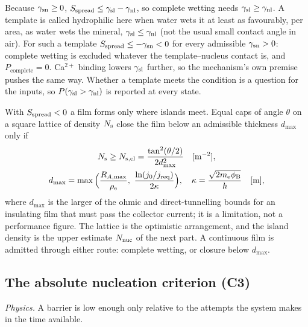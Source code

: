 Because $\gamma_\mathrm{sn}\ge0$, $S_\mathrm{spread}\le\gamma_\mathrm{sl}-\gamma_\mathrm{nl}$, so complete wetting needs $\gamma_\mathrm{sl}\ge\gamma_\mathrm{nl}$. A template is called
hydrophilic here when water wets it at least as favourably, per area, as water wets the mineral,
$\gamma_\mathrm{sl}\le\gamma_\mathrm{nl}$ (not the usual small contact angle in air). For such a template $S_\mathrm{spread}\le-\gamma_\mathrm{sn}<0$ for every
admissible $\gamma_\mathrm{sn}>0$: complete wetting is excluded whatever the template--nucleus contact is, and
$P_\mathrm{complete}=0$. Ca$^{2+}$ binding lowers $\gamma_\mathrm{sl}$ further, so the mechanism's own premise pushes
the same way. Whether a template meets the condition is a question for the inputs, so $P(\gamma_\mathrm{sl}>\gamma_\mathrm{nl})$ is
reported at every state.

With $S_\mathrm{spread}<0$ a film forms only where islands meet. Equal caps of angle $\theta$ on a square lattice of
density $N_\mathrm{s}$ close the film below an admissible thickness $d_\mathrm{max}$ only if
\begin{equation}\label{thsi:eq:closure}
\begin{gathered}
\Ns\ge N_\mathrm{s,cl}=\frac{\tan^{2}(\theta/2)}{2d_\mathrm{max}^{2}} \un{m^{-2}},\\
d_\mathrm{max}=\max\Big(\frac{R_{A,\max}}{\rhoe},\ \frac{\ln(j_0/\jreq)}{2\kappa}\Big),\quad \kappa=\frac{\sqrt{2m_\mathrm{e}\phiB}}{\hbar} \un{m},
\end{gathered}
\end{equation}
where $d_\mathrm{max}$ is the larger of the ohmic and direct-tunnelling bounds for an insulating film
that must pass the collector current; it is a limitation, not a performance figure. The lattice is the
optimistic arrangement, and the island density is the upper estimate $N_\mathrm{nuc}$ of the next part. A
continuous film is admitted through either route: complete wetting, or closure below $d_\mathrm{max}$.

\subsection{The absolute nucleation criterion (C3)}\label{thsi:sec:access}

\textit{Physics.} A barrier is low enough only relative to the attempts the system makes in the time
available.

